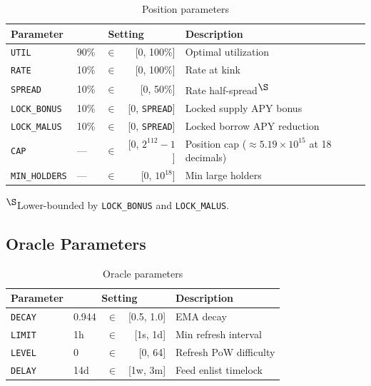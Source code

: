 \documentclass[10pt,a4paper,twocolumn]{article}
\begin{document}
\begin{table}[H]
\centering
\caption{Position parameters}
\label{tab:position-params}
\small
\begin{tabularx}{0.95\columnwidth}{@{}l l@{\,}c@{\,}r X@{}}
\toprule
Parameter & \multicolumn{3}{c}{Setting} & Description \\
\midrule
\texttt{UTIL} & 90\% & $\in$ & [0, 100\%] & Optimal utilization \\
\texttt{RATE} & 10\% & $\in$ & [0, 100\%] & Rate at kink \\
\texttt{SPREAD} & 10\% & $\in$ & [0, 50\%] & Rate half-spread\textsuperscript{$\S$} \\
\texttt{LOCK\_BONUS} & 10\% & $\in$ & [0, \texttt{SPREAD}] & Locked supply APY bonus \\
\texttt{LOCK\_MALUS} & 10\% & $\in$ & [0, \texttt{SPREAD}] & Locked borrow APY reduction \\
\texttt{CAP} & --- & $\in$ & [0, $2^{112}{-}1$] & Position cap ($\approx 5.19 \times 10^{15}$ at 18 decimals) \\
\texttt{MIN\_HOLDERS} & --- & $\in$ & [0, $10^{18}$] & Min large holders \\
\bottomrule
\end{tabularx}
\vspace{0.3em}
\par\raggedright\scriptsize\textsuperscript{$\S$}Lower-bounded by \texttt{LOCK\_BONUS} and \texttt{LOCK\_MALUS}.
\end{table}

\subsection{Oracle Parameters}

\begin{table}[H]
\centering
\caption{Oracle parameters}
\label{tab:oracle-params}
\small
\begin{tabularx}{0.95\columnwidth}{@{}l l@{\,}c@{\,}r X@{}}
\toprule
Parameter & \multicolumn{3}{c}{Setting} & Description \\
\midrule
\texttt{DECAY} & 0.944 & $\in$ & [0.5, 1.0] & EMA decay \\
\texttt{LIMIT} & 1h & $\in$ & [1s, 1d] & Min refresh interval \\
\texttt{LEVEL} & 0 & $\in$ & [0, 64] & Refresh PoW difficulty \\
\texttt{DELAY} & 14d & $\in$ & [1w, 3m] & Feed enlist timelock \\
\bottomrule
\end{tabularx}
\end{table}
\end{document}
